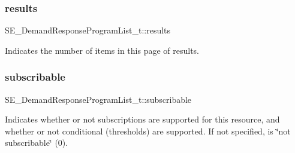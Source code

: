 \subsubsection{\texorpdfstring{results}{results}}
{\footnotesize\ttfamily S\+E\+\_\+\+Demand\+Response\+Program\+List\+\_\+t\+::results}

Indicates the number of items in this page of results. \mbox{\label{group__DemandResponseProgramList_ga8ae2eb55ac9951bd8d8e11644ff223f9}} 
\subsubsection{\texorpdfstring{subscribable}{subscribable}}
{\footnotesize\ttfamily S\+E\+\_\+\+Demand\+Response\+Program\+List\+\_\+t\+::subscribable}

Indicates whether or not subscriptions are supported for this resource, and whether or not conditional (thresholds) are supported. If not specified, is \char`\"{}not subscribable\char`\"{} (0). 